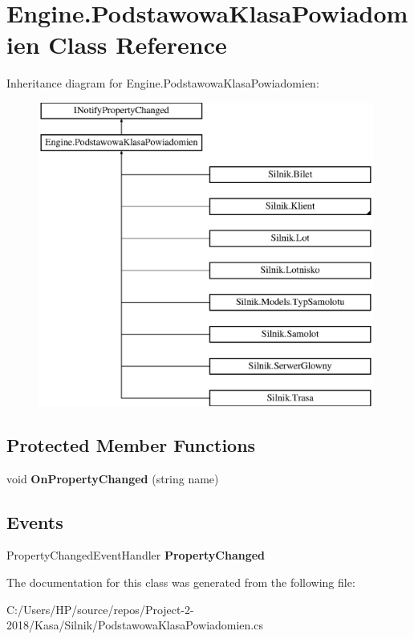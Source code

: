 \hypertarget{class_engine_1_1_podstawowa_klasa_powiadomien}{}\section{Engine.\+Podstawowa\+Klasa\+Powiadomien Class Reference}
\label{class_engine_1_1_podstawowa_klasa_powiadomien}
Inheritance diagram for Engine.\+Podstawowa\+Klasa\+Powiadomien\+:\begin{figure}[H]
\begin{center}
\leavevmode
\includegraphics[height=10.000000cm]{class_engine_1_1_podstawowa_klasa_powiadomien}
\end{center}
\end{figure}
\subsection*{Protected Member Functions}
\begin{DoxyCompactItemize}
\item 
\mbox{\label{class_engine_1_1_podstawowa_klasa_powiadomien_a1c3334a7504b249fe9c93f410c56fb7b}} 
void {\bfseries On\+Property\+Changed} (string name)
\end{DoxyCompactItemize}
\subsection*{Events}
\begin{DoxyCompactItemize}
\item 
\mbox{\label{class_engine_1_1_podstawowa_klasa_powiadomien_a3b655c9a2008f6e9c68f60d6f7d243b4}} 
Property\+Changed\+Event\+Handler {\bfseries Property\+Changed}
\end{DoxyCompactItemize}


The documentation for this class was generated from the following file\+:\begin{DoxyCompactItemize}
\item 
C\+:/\+Users/\+H\+P/source/repos/\+Project-\/2-\/2018/\+Kasa/\+Silnik/Podstawowa\+Klasa\+Powiadomien.\+cs\end{DoxyCompactItemize}
